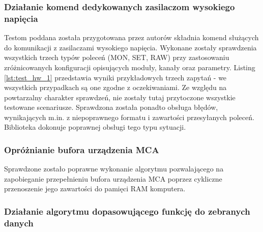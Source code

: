 \subsubsection*{Działanie komend dedykowanych zasilaczom wysokiego napięcia}
Testom poddana została przygotowana przez autorów składnia komend służących do komunikacji z zasilaczami wysokiego napięcia. Wykonane zostały sprawdzenia wszystkich trzech typów poleceń (MON, SET, RAW) przy zastosowaniu zróżnicowanych konfiguracji opisujących moduły, kanały oraz parametry. Listing \ref{lst:test_hw_1} przedstawia wyniki przykładowych trzech zapytań - we wszystkich przypadkach są one zgodne z oczekiwaniami. Ze względu na powtarzalny charakter sprawdzeń, nie zostały tutaj przytoczone wszystkie testowane scenariusze. Sprawdzona została ponadto obsługa błędów, wynikających m.in. z niepoprawnego formatu i zawartości przesyłanych poleceń. Biblioteka dokonuje poprawnej obsługi tego typu sytuacji.



\subsubsection*{Opróżnianie bufora urządzenia MCA}
Sprawdzone zostało poprawne wykonanie algorytmu pozwalającego na zapobieganie przepełnieniu bufora urządzenia MCA poprzez cykliczne przenoszenie jego zawartości do pamięci RAM komputera. 



\subsubsection*{Działanie algorytmu dopasowującego funkcję do zebranych danych}


